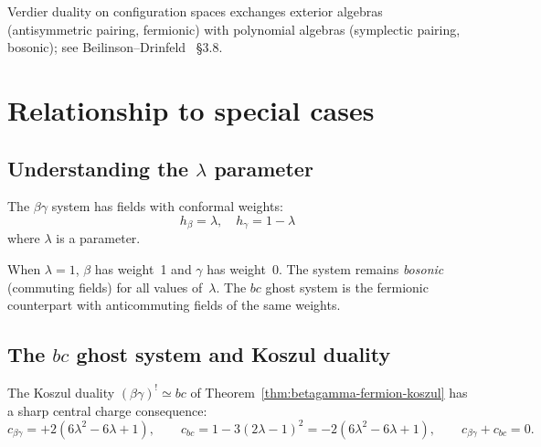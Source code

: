 \begin{remark}
Verdier duality on configuration spaces exchanges exterior algebras (antisymmetric pairing, fermionic) with polynomial algebras (symplectic pairing, bosonic); see Beilinson--Drinfeld~\cite{BD04} \S3.8.
\end{remark}

\section{Relationship to special cases}

\subsection{\texorpdfstring{Understanding the $\lambda$ parameter}{Understanding the parameter}}

\begin{remark}
The $\beta\gamma$ system has fields with conformal weights:
\[h_\beta = \lambda, \quad h_\gamma = 1-\lambda\]
where $\lambda$ is a parameter.

When $\lambda = 1$, $\beta$ has weight~1 and $\gamma$ has weight~0. The system remains \emph{bosonic} (commuting fields) for all values of~$\lambda$. The $bc$ ghost system is the fermionic counterpart with anticommuting fields of the same weights.
\end{remark}

\subsection{\texorpdfstring{The $bc$ ghost system and Koszul duality}{The bc ghost system and Koszul duality}}

\begin{proposition}\label{prop:betagamma-bc-koszul-detailed}
The Koszul duality $(\beta\gamma)^! \simeq bc$ of Theorem~\ref{thm:betagamma-fermion-koszul}
has a sharp central charge consequence:
\begin{equation}\label{eq:bg-bc-koszul}
c_{\beta\gamma} = +2(6\lambda^2 - 6\lambda + 1),
\qquad
c_{bc} = 1 - 3(2\lambda - 1)^2 = -2(6\lambda^2 - 6\lambda + 1),
\qquad
c_{\beta\gamma} + c_{bc} = 0.
\end{equation}
\end{proposition}

